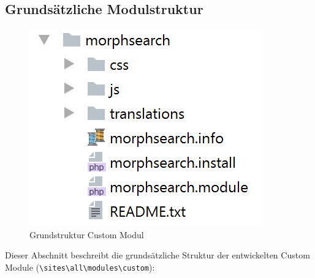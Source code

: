 \subsection{Grundsätzliche Modulstruktur}\label{sub:strukture_module}
\begin{figure}
	\centering
	\includegraphics[height=0.2\textheight]{images/structure_module}
	\caption{Grundstruktur Custom Modul}
	\label{fig:structuremodule}
\end{figure}

Dieser Abschnitt beschreibt die grundsätzliche Struktur der entwickelten Custom Module (\lstinline|\sites\all\modules\custom|):

